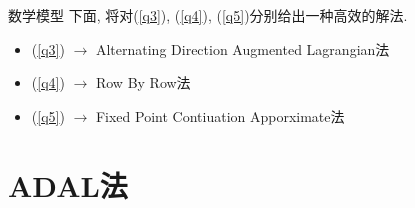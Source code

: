 \documentclass[slidestop, compress, mathserif, UTF8]{beamer}
\numberwithin{equation}{section}                                        %
\begin{document}
            \begin{frame}[t]{数学模型}
                下面, 将对(\ref{q3}), (\ref{q4}), (\ref{q5})分别给出一种高效的解法.

                \begin{itemize}
                    \item (\ref{q3}) $\rightarrow$ Alternating Direction Augmented Lagrangian法

                    \item (\ref{q4}) $\rightarrow$ Row By Row法

                    \item (\ref{q5}) $\rightarrow$ Fixed Point Contiuation Apporximate法

                \end{itemize}
            \end{frame}
    \section{ADAL法}\label{section2}
\end{document}
